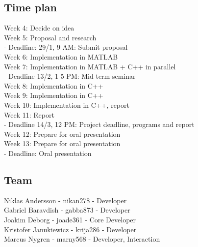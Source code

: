\documentclass[a4paper,12pt,twoside,swedish]{report}
\begin{document}
\subsection{Time plan}
Week 4: Decide on idea \\
Week 5: Proposal and research \\
- Deadline: 29/1, 9 AM: Submit proposal \\
Week 6: Implementation in MATLAB \\
Week 7: Implementation in MATLAB + C++ in parallel \\
- Deadline 13/2, 1-5 PM: Mid-term seminar \\
Week 8: Implementation in C++ \\
Week 9: Implementation in C++ \\
Week 10: Implementation in C++, report \\
Week 11: Report \\
- Deadline 14/3, 12 PM: Project deadline, programs and report \\
Week 12: Prepare for oral presentation \\
Week 13: Prepare for oral presentation \\
- Deadline: Oral presentation

 \subsection{Team}
Niklas Andersson - nikan278 - Developer\\
Gabriel Baravdish - gabba873 - Developer\\
Joakim Deborg - joade361 - Core Developer\\
Kristofer Janukiewicz - krija286 - Developer\\
Marcus Nygren - marny568 - Developer, Interaction
\end{document}
